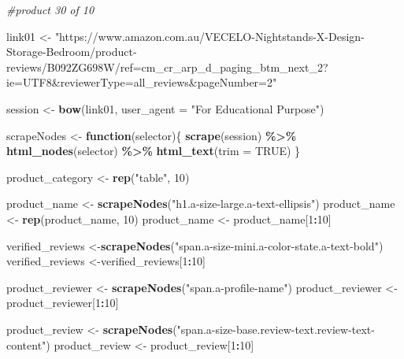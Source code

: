 \documentclass[
]{article}
\newenvironment{Shaded}{\begin{snugshade}}{\end{snugshade}}
\newcommand{\AttributeTok}[1]{\textcolor[rgb]{0.13,0.29,0.53}{#1}}
\newcommand{\CommentTok}[1]{\textcolor[rgb]{0.56,0.35,0.01}{\textit{#1}}}
\newcommand{\ConstantTok}[1]{\textcolor[rgb]{0.56,0.35,0.01}{#1}}
\newcommand{\ControlFlowTok}[1]{\textcolor[rgb]{0.13,0.29,0.53}{\textbf{#1}}}
\newcommand{\DecValTok}[1]{\textcolor[rgb]{0.00,0.00,0.81}{#1}}
\newcommand{\FunctionTok}[1]{\textcolor[rgb]{0.13,0.29,0.53}{\textbf{#1}}}
\newcommand{\NormalTok}[1]{#1}
\newcommand{\OtherTok}[1]{\textcolor[rgb]{0.56,0.35,0.01}{#1}}
\newcommand{\SpecialCharTok}[1]{\textcolor[rgb]{0.81,0.36,0.00}{\textbf{#1}}}
\newcommand{\StringTok}[1]{\textcolor[rgb]{0.31,0.60,0.02}{#1}}
\begin{document}
\begin{Shaded}
\begin{Highlighting}[]
\CommentTok{\#product 30 of 10}

\NormalTok{link01 }\OtherTok{\textless{}{-}} \StringTok{"https://www.amazon.com.au/VECELO{-}Nightstands{-}X{-}Design{-}Storage{-}Bedroom/product{-}reviews/B092ZG698W/ref=cm\_cr\_arp\_d\_paging\_btm\_next\_2?ie=UTF8\&reviewerType=all\_reviews\&pageNumber=2"}


\NormalTok{  session }\OtherTok{\textless{}{-}} \FunctionTok{bow}\NormalTok{(link01,}
               \AttributeTok{user\_agent =} \StringTok{"For Educational Purpose"}\NormalTok{)}

\NormalTok{  scrapeNodes }\OtherTok{\textless{}{-}} \ControlFlowTok{function}\NormalTok{(selector)\{}
    \FunctionTok{scrape}\NormalTok{(session) }\SpecialCharTok{\%\textgreater{}\%}
      \FunctionTok{html\_nodes}\NormalTok{(selector) }\SpecialCharTok{\%\textgreater{}\%}
      \FunctionTok{html\_text}\NormalTok{(}\AttributeTok{trim =} \ConstantTok{TRUE}\NormalTok{)}
\NormalTok{  \}}

\NormalTok{  product\_category }\OtherTok{\textless{}{-}} \FunctionTok{rep}\NormalTok{(}\StringTok{"table"}\NormalTok{, }\DecValTok{10}\NormalTok{)}

\NormalTok{  product\_name }\OtherTok{\textless{}{-}} \FunctionTok{scrapeNodes}\NormalTok{(}\StringTok{"h1.a{-}size{-}large.a{-}text{-}ellipsis"}\NormalTok{)}
\NormalTok{  product\_name }\OtherTok{\textless{}{-}} \FunctionTok{rep}\NormalTok{(product\_name, }\DecValTok{10}\NormalTok{)}
\NormalTok{  product\_name }\OtherTok{\textless{}{-}}\NormalTok{ product\_name[}\DecValTok{1}\SpecialCharTok{:}\DecValTok{10}\NormalTok{]}
  
\NormalTok{  verified\_reviews }\OtherTok{\textless{}{-}}\FunctionTok{scrapeNodes}\NormalTok{(}\StringTok{"span.a{-}size{-}mini.a{-}color{-}state.a{-}text{-}bold"}\NormalTok{)}
\NormalTok{  verified\_reviews }\OtherTok{\textless{}{-}}\NormalTok{verified\_reviews[}\DecValTok{1}\SpecialCharTok{:}\DecValTok{10}\NormalTok{]}
  
\NormalTok{  product\_reviewer }\OtherTok{\textless{}{-}} \FunctionTok{scrapeNodes}\NormalTok{(}\StringTok{"span.a{-}profile{-}name"}\NormalTok{)}
\NormalTok{  product\_reviewer }\OtherTok{\textless{}{-}}\NormalTok{ product\_reviewer[}\DecValTok{1}\SpecialCharTok{:}\DecValTok{10}\NormalTok{]}
  
\NormalTok{  product\_review }\OtherTok{\textless{}{-}} \FunctionTok{scrapeNodes}\NormalTok{(}\StringTok{"span.a{-}size{-}base.review{-}text.review{-}text{-}content"}\NormalTok{)}
\NormalTok{  product\_review }\OtherTok{\textless{}{-}}\NormalTok{ product\_review[}\DecValTok{1}\SpecialCharTok{:}\DecValTok{10}\NormalTok{]}
  

\end{Highlighting}
\end{Shaded}
\end{document}
